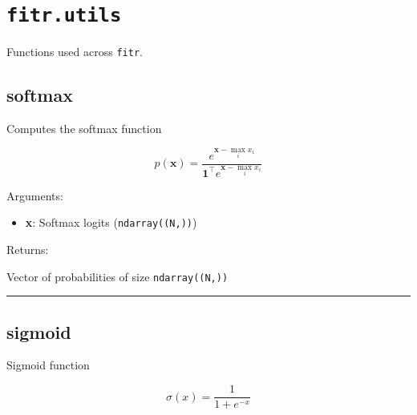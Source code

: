\hypertarget{fitr.utils}{%
\section{\texorpdfstring{\texttt{fitr.utils}}{fitr.utils}}\label{fitr.utils}}

Functions used across \texttt{fitr}.

\hypertarget{softmax}{%
\subsection{softmax}\label{softmax}}

\begin{Shaded}
\begin{Highlighting}[]
\end{Highlighting}
\end{Shaded}

Computes the softmax function

\[
p(\mathbf{x}) = \frac{e^{\mathbf{x} - \max_i x_i}}{\mathbf{1}^\top e^{\mathbf{x} - \max_i x_i}}
\]

Arguments:

\begin{itemize}
\tightlist
\item
  \textbf{x}: Softmax logits (\texttt{ndarray((N,))})
\end{itemize}

Returns:

Vector of probabilities of size \texttt{ndarray((N,))}

\begin{center}\rule{0.5\linewidth}{\linethickness}\end{center}

\hypertarget{sigmoid}{%
\subsection{sigmoid}\label{sigmoid}}

\begin{Shaded}
\begin{Highlighting}[]
\OperatorTok{=-}\OperatorTok{=}\NormalTok{)}
\end{Highlighting}
\end{Shaded}

Sigmoid function

\[
\sigma(x) = \frac{1}{1 + e^{-x}}
\]

